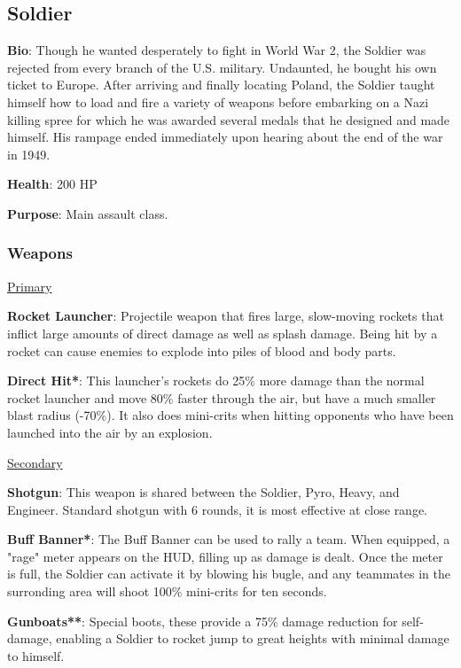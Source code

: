 \subsection{Soldier}
{\bf Bio}:
Though he wanted desperately to fight in World War 2, the Soldier was rejected from every branch of the U.S. military. Undaunted, he bought his own ticket to Europe. After arriving and finally locating Poland, the Soldier taught himself how to load and fire a variety of weapons before embarking on a Nazi killing spree for which he was awarded several medals that he designed and made himself. His rampage ended immediately upon hearing about the end of the war in 1949.

{\bf Health}: 200 HP

{\bf Purpose}:
Main assault class.

\subsubsection {Weapons}

\begin {center}
\underline {Primary}
\end {center}

{\bf Rocket Launcher}: Projectile weapon that fires large, slow-moving rockets that inflict large amounts of direct damage as well as splash damage. Being hit by a rocket can cause enemies to explode into piles of blood and body parts. 

{\bf Direct Hit*}: This launcher's rockets do 25\% more damage than the normal rocket launcher and move 80\% faster through the air, but have a much smaller blast radius (-70\%). It also does mini-crits when hitting opponents who have been launched into the air by an explosion.

\begin {center}
\underline {Secondary}
\end {center}

{\bf Shotgun}: This weapon is shared between the Soldier, Pyro, Heavy, and Engineer. Standard shotgun with 6 rounds, it is most effective at close range. 

{\bf Buff Banner*}: The Buff Banner can be used to rally a team.  When equipped, a "rage" meter appears on the HUD, filling up as damage is dealt.  Once the meter is full, the Soldier can activate it by blowing his bugle, and any teammates in the surronding area will shoot 100\% mini-crits for ten seconds.

{\bf Gunboats**}: Special boots, these provide a 75\% damage reduction for self-damage, enabling a Soldier to rocket jump to great heights with minimal damage to himself.

